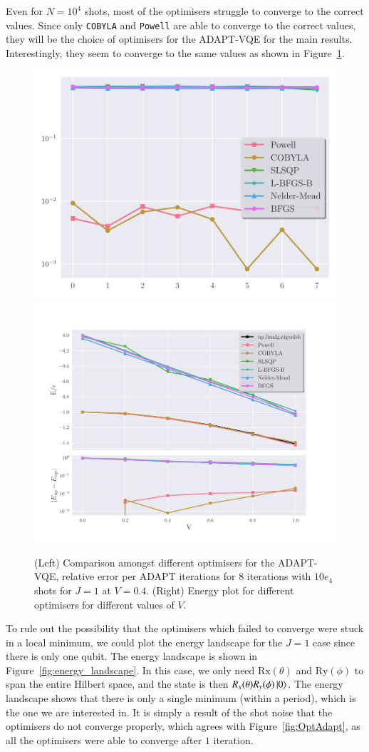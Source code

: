 Even for $ N = 10^4 $ shots, most of the optimisers struggle to converge to the correct values. Since only \texttt{COBYLA} and \texttt{Powell} are able to converge to the correct values, they will be the choice of optimisers for the ADAPT-VQE for the main results. Interestingly, they seem to converge to the same values as shown in Figure~\ref{fig:optcmpj1}. 
\begin{figure}[ht]
	\centering
	\includegraphics[width=0.45\linewidth]{image/lipkin_result/whynotothersv=0.4.pdf}
	\includegraphics[width=0.45\linewidth]{image/lipkin_result/whynotothers10e4.pdf}	
	\caption{(Left) Comparison amongst different optimisers for the ADAPT-VQE, relative error per ADAPT iterations for $ 8 $ iterations with $ 10e_4 $ shots for $ J=1 $ at $V=0.4$. (Right) Energy plot for different optimisers for different values of $V$.}
	\label{fig:optcmpj1}
\end{figure}

To rule out the possibility that the optimisers which failed to converge were stuck in a local minimum, we could plot the energy landscape for the $ J=1 $ case since there is only one qubit. The energy landscape is shown in Figure~\ref{fig:energy_landscape}. In this case, we only need $ \text{Rx}(\theta) $ and $ \text{Ry}(\phi) $ to span the entire Hilbert space, and the state is then $ R_x(\theta) R_y(\phi)\ket{0}$. The energy landscape shows that there is only a single minimum (within a period), which is the one we are interested in. It is simply a result of the shot noise that the optimisers do not converge properly, which agrees with  Figure~\ref{fig:OptAdapt}, as all the optimisers were able to converge after $ 1 $ iteration.

